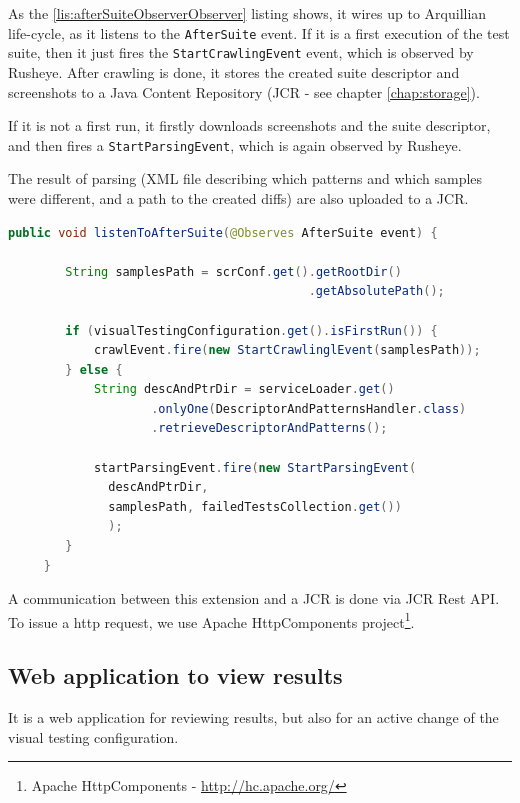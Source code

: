 \documentclass[11pt,oneside,final]{fithesis2}
\begin{document}
    As the \ref{lis:afterSuiteObserverObserver} listing shows, it wires up to Arquillian life-cycle, as it listens to the \texttt{AfterSuite} event. 
    If it is a first execution of the test suite, then it just fires the \texttt{StartCrawlingEvent} event, which is observed by Rusheye. 
    After crawling is done, it stores the created suite descriptor and screenshots to a Java Content Repository 
    (JCR - see chapter \ref{chap:storage}).
    
    If it is not a first run, it firstly downloads screenshots and the suite descriptor, and then fires a \texttt{StartParsingEvent}, 
    which is again observed by Rusheye.
    
    The result of parsing (XML file describing which patterns and which samples were different, and a path to the created diffs) are also uploaded
    to a JCR.
    
    \begin{lstlisting}[caption=AfterSuite observer to controll Rusheye,label=lis:afterSuiteObserverObserver,language=java, breaklines=true]
     public void listenToAfterSuite(@Observes AfterSuite event) {
        
        String samplesPath = scrConf.get().getRootDir()
                                          .getAbsolutePath();
        
        if (visualTestingConfiguration.get().isFirstRun()) {
            crawlEvent.fire(new StartCrawlinglEvent(samplesPath));
        } else {
            String descAndPtrDir = serviceLoader.get()
                    .onlyOne(DescriptorAndPatternsHandler.class)
                    .retrieveDescriptorAndPatterns();
            
            startParsingEvent.fire(new StartParsingEvent(
		      descAndPtrDir,
		      samplesPath, failedTestsCollection.get())
		      );
        }
     }
    \end{lstlisting}
    
    A communication between this extension and a JCR is done via JCR Rest API. To issue a http request, we use Apache HttpComponents
    project\footnote{Apache HttpComponents - \url{http://hc.apache.org/}}.
 
    \newpage
    \subsection{Web application to view results}
    \label{sec:webManagerAppDesc}
    It is a web application for reviewing results, but also for an active change
    of the visual testing configuration.
    
\end{document}
